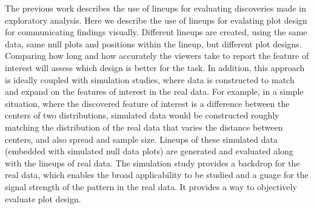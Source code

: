The previous work \citet{buja:2009,wickham:2010} describes the use of
lineups for evaluating discoveries made in exploratory analysis. Here
we describe the use of lineups for evalating plot design for
communicating findings visually. Different lineups are created, using
the same data, same null plots and positions within the lineup, but
different plot designs. Comparing how long and how accurately the
viewers take to report the feature of interest will assess which
design is better for the task. In addition, this approach is ideally
coupled with simulation studies, where data is constructed to match
and expand on the features of interest in the real data. For example,
in a simple situation, where the discovered feature of interest is a
difference between the centers of two distributions, simulated data
would be constructed roughly matching the distribution of the real
data that varies the distance between centers, and also spread and
sample size. Lineups of these simulated data (embedded with simulated
null data plots) are generated and evaluated along with the lineups of
real data. The simulation study provides a backdrop for the real data,
which enables the broad applicability to be studied and a guage for
the signal strength of the pattern in the real data. It provides a way
to objectively evaluate plot design.




